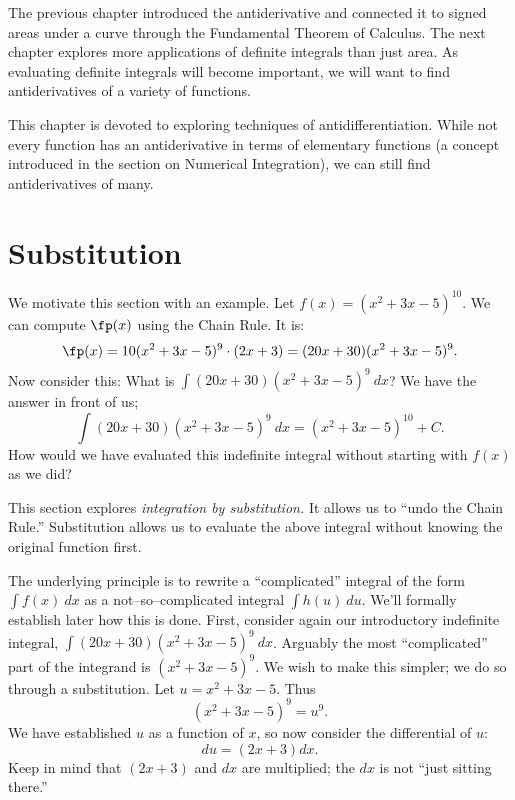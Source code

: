 %

The previous chapter introduced the antiderivative and connected it to signed areas under a curve through the Fundamental Theorem of Calculus. The next chapter explores more applications of definite integrals than just area. As evaluating definite integrals will become important, we will want to find antiderivatives of a variety of functions.

This chapter is devoted to exploring techniques of antidifferentiation. While not every function has an antiderivative in terms of elementary functions (a concept introduced in the section on Numerical Integration), we can still find antiderivatives of many.


\section{Substitution}\label{sec:substitution}

We motivate this section with an example. Let $f(x) = (x^2+3x-5)^{10}$. We can compute $\fp(x)$ using the Chain Rule. It is:
	$$\fp(x) = 10(x^2+3x-5)^9\cdot(2x+3) = (20x+30)(x^2+3x-5)^9.$$
Now consider this: What is $\int (20x+30)(x^2+3x-5)^9\ dx$? We have the answer in front of us; $$\int (20x+30)(x^2+3x-5)^9\ dx = (x^2+3x-5)^{10}+C.$$
How would we have evaluated this indefinite integral without starting with $f(x)$ as we did?

This section explores \textit{integration by substitution.} It allows us to ``undo the Chain Rule.'' Substitution allows us to evaluate the above integral without knowing the original function first.

The underlying principle is to rewrite a ``complicated'' integral of the form $\int f(x)\ dx$ as a not--so--complicated integral $\int h(u)\ du$. We'll formally establish later how this is done. First, consider again our introductory indefinite integral, $\int (20x+30)(x^2+3x-5)^9\ dx$. Arguably the most ``complicated'' part of the integrand is $(x^2+3x-5)^9$. We wish to make this simpler; we do so through a substitution. Let $u=x^2+3x-5$. Thus $$(x^2+3x-5)^9 = u^9.$$
We have established $u$ as a function of $x$, so now consider the differential of $u$: $$du = (2x+3)dx.$$ Keep in mind that $(2x+3)$ and $dx$ are multiplied; the $dx$ is not ``just sitting there.''

